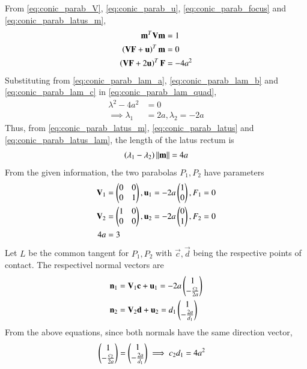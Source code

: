 \begin{enumerate}[label=\arabic*.,ref=\thesubsection.\theenumi]
From \eqref{eq:conic_parab_V}, \eqref{eq:conic_parab_u}, \eqref{eq:conic_parab_focus} and \eqref{eq:conic_parab_latus_m}, 
\begin{align}
\label{eq:conic_parab_lam_a}
\mathbf{m}^T\mathbf{V}\mathbf{m} &= 1
\\
\label{eq:conic_parab_lam_b}
\left(\mathbf{V}\mathbf{F}+\mathbf{u}\right)^T\mathbf{m} &= 0
\\
\left(\mathbf{V}\mathbf{F}+2\mathbf{u}\right)^T\mathbf{F} &= -4a^2
\label{eq:conic_parab_lam_c}
\end{align}
Substituting from \eqref{eq:conic_parab_lam_a}, \eqref{eq:conic_parab_lam_b}  and \eqref{eq:conic_parab_lam_c} in \eqref{eq:conic_parab_lam_quad}, 
\begin{align}
\lambda^2  - 4a^2 &=0
\\
\implies \lambda_1 &=2a,\lambda_2 =-2a
\label{eq:conic_parab_latus_lam}
\end{align}
%
Thus, from \eqref{eq:conic_parab_latus_m}, \eqref{eq:conic_parab_latus}
 and \eqref{eq:conic_parab_latus_lam}, the length of the latus rectum is
\begin{align}
\left(\lambda_1-\lambda_2\right) \left\lVert\mathbf{m}\right\rVert = 4a
\end{align}
%
From the given information, the two parabolas $P_1, P_2$ have parameters
\begin{align}
\label{eq:conic_parab_param1}
\mathbf{V}_1&=\begin{pmatrix}0 & 0 \\ 0& 1\end{pmatrix},\mathbf{u}_1=-2a\begin{pmatrix}1 \\ 0\end{pmatrix},F_1=0
\\
\label{eq:conic_parab_param2}
\mathbf{V}_2&=\begin{pmatrix}1 & 0 \\ 0& 0\end{pmatrix},
\mathbf{u}_2=-2a\begin{pmatrix}0 \\ 1\end{pmatrix},
F_2=0
\\
4a&=3
\label{eq:conic_parab_a}
\end{align}
Let $L$ be the common tangent for $P_1,P_2$ with  $\vec{c},\vec{d}$ being the respective points of contact. The respectivel normal vectors are
\begin{align}
\mathbf{n}_1 &= \mathbf{V}_1\mathbf{c}+\mathbf{u}_1 = -2a\begin{pmatrix}1\\-\frac{c_2}{2a}\end{pmatrix}
\\
\mathbf{n}_2 &= \mathbf{V}_2\mathbf{d}+\mathbf{u}_2  = d_1\begin{pmatrix}1\\-\frac{2a}{d_1}\end{pmatrix}
\end{align}
%
From the above equations, since both normals have the same direction vector, 
\begin{align}
\begin{pmatrix}1\\-\frac{c_2}{2a}\end{pmatrix}&=\begin{pmatrix}1\\-\frac{2a}{d_1}\end{pmatrix}
\implies c_2d_1 = 4a^2
\end{align}


\end{enumerate}

